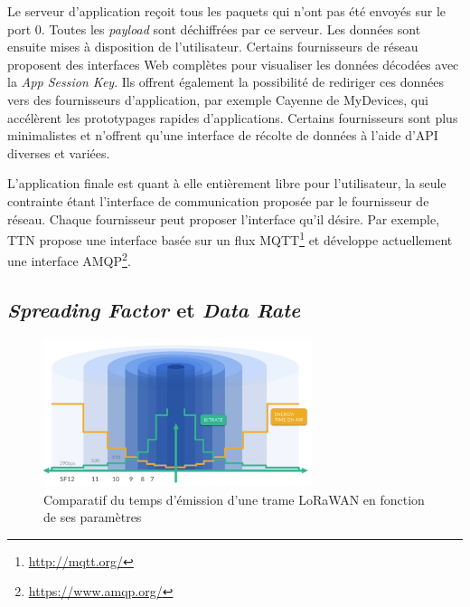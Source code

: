 Le serveur d'application reçoit tous les paquets qui n'ont pas été envoyés sur le port 0. Toutes les \textit{payload} sont déchiffrées par ce serveur. Les données sont ensuite mises à disposition de l'utilisateur. Certains fournisseurs de réseau proposent des interfaces Web complètes pour visualiser les données décodées avec la \textit{App Session Key}. Ils offrent également la possibilité de rediriger ces données vers des fournisseurs d'application, par exemple Cayenne de MyDevices, qui accélèrent les prototypages rapides d'applications. Certains fournisseurs sont plus minimalistes et n'offrent qu'une interface de récolte de données à l'aide d'API diverses et variées. 

L'application finale est quant à elle entièrement libre pour l'utilisateur, la seule contrainte étant l'interface de communication proposée par le fournisseur de réseau. Chaque fournisseur peut proposer l'interface qu'il désire. Par exemple, TTN propose une interface basée sur un flux MQTT\footnote{\url{http://mqtt.org/}} et développe actuellement une interface AMQP\footnote{\url{https://www.amqp.org/}}. 


\subsection{\textit{Spreading Factor} et \textit{Data Rate}}
\label{sec-protocols_lorawan_spreading_factor}


\begin{figure}[ht!]
    \centering
    \includegraphics[width=0.7\textwidth]{Figures/Protocols/LoRaWAN/lora_datarate_airtime.png}
    \caption{Comparatif du temps d'émission d'une trame LoRaWAN en fonction de ses paramètres}
    \label{fig-lora_datarate_airtime}
\end{figure}

